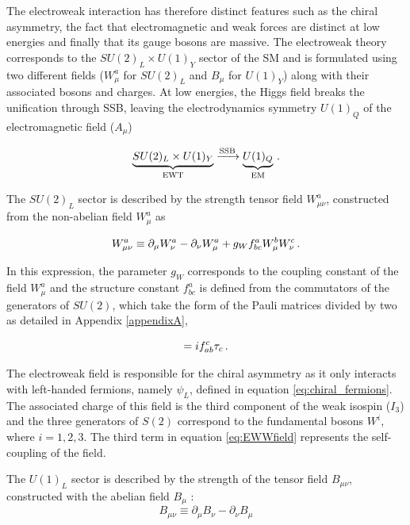 The electroweak interaction has therefore distinct features such as the chiral asymmetry, the fact that electromagnetic and weak forces are distinct at low energies and finally that its gauge bosons are massive. The electroweak theory corresponds to the $SU(2)_L \times U(1)_Y$ sector of the SM and is formulated using two different fields ($W_{\mu}^a$ for $SU(2)_L$ and $B_{\mu}$ for $U(1)_Y$) along with their associated bosons and charges. At low energies, the Higgs field breaks the unification through SSB, leaving the electrodynamics symmetry $U(1)_Q$ of the electromagnetic field ($A_{\mu}$)

\begin{equation}
    \underbrace{SU(2)_L \times U(1)_Y}_\text{EWT} \xrightarrow{\text{SSB}} \underbrace{U(1)_Q}_{\text{EM}} \mend
\end{equation}

The $SU(2)_L$ sector is described by the strength tensor field $W_{\mu\nu}^a$, constructed from the non-abelian field $W_{\mu}^a$ as

\begin{equation}
    W_{\mu\nu}^a \equiv \partial_{\mu} W_{\nu}^a - \partial_{\nu} W_{\mu}^a + g_W f_{bc}^a W_{\mu}^b W_{\nu}^c \mend
    \label{eq:EWWfield}
\end{equation}

In this expression, the parameter $g_W$ corresponds to the coupling constant of the field $W_{\mu}^a$ and the structure constant $f_{bc}^a$ is defined from the commutators of the generators of $SU(2)$, which take the form of the Pauli matrices divided by two as detailed in Appendix \ref{appendixA},

\begin{equation}
    [\tau_a , \tau_b] = if_{ab}^c \tau_c \mend
\end{equation}

The electroweak field is responsible for the chiral asymmetry as it only interacts with left-handed fermions, namely $\psi_L$, defined in equation \ref{eq:chiral_fermions}. The associated charge of this field is the third component of the weak isospin ($I_3$) and the three generators of $S(2)$ correspond to the fundamental bosons $W^i$, where $i = {1,2,3}$. The third term in equation \ref{eq:EWWfield} represents the self-coupling of the field.

The $U(1)_L$ sector is described by the strength of the tensor field $B_{\mu\nu}$, constructed with the abelian field $B_{\mu}$ :
\begin{equation}
    B_{\mu\nu} \equiv \partial_{\mu}B_{\nu} - \partial_{\nu}B_{\mu}
\end{equation}

